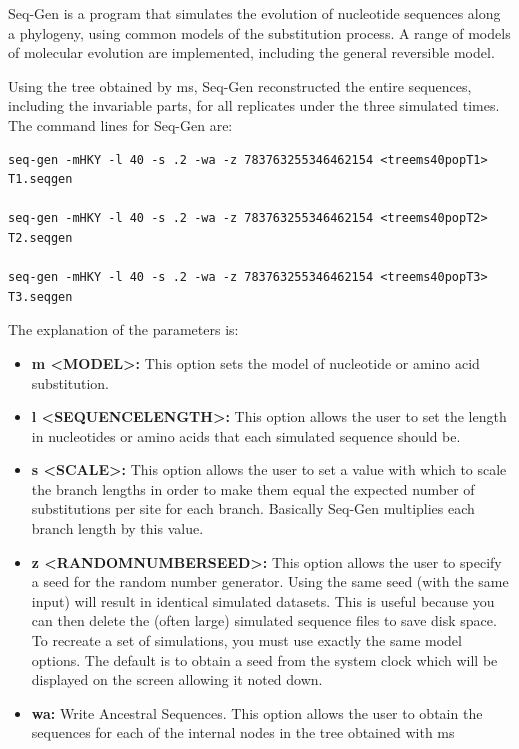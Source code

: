Seq-Gen \cite{rambaut1997seq} is a program that simulates the evolution of nucleotide sequences along a phylogeny, using common models of the substitution process. A range of models of molecular evolution are implemented, including the general reversible model. 

Using the tree obtained by ms, Seq-Gen reconstructed the entire sequences, including the invariable parts, for all replicates under the three simulated times. The command lines for Seq-Gen are: 

\begin{verbatim}
seq-gen -mHKY -l 40 -s .2 -wa -z 783763255346462154 <treems40popT1> T1.seqgen

seq-gen -mHKY -l 40 -s .2 -wa -z 783763255346462154 <treems40popT2> T2.seqgen

seq-gen -mHKY -l 40 -s .2 -wa -z 783763255346462154 <treems40popT3> T3.seqgen

\end{verbatim}

The explanation of the parameters is:

\begin{itemize}

\item\textbf{m <MODEL>:} This option sets the model of nucleotide or amino acid substitution.
\item\textbf{l <SEQUENCELENGTH>:} This option allows the user to set the length in nucleotides or amino acids that each simulated sequence should be.
\item\textbf{s <SCALE>:} This option allows the user to set a value with which to scale the branch lengths in order to make them equal the expected number of substitutions per site for each branch. Basically Seq-Gen multiplies each branch length by this value.
\item\textbf{z <RANDOMNUMBERSEED>:} This option allows the user to specify a seed for the random number generator. Using the same seed (with the same input) will result in identical simulated datasets. This is useful because you can then delete the (often large) simulated sequence files to save disk space. To recreate a set of simulations, you must use exactly the same model options. The default is to obtain a seed from the system clock which will be displayed on the screen allowing it noted down.
\item\textbf{wa:}
Write Ancestral Sequences. This option allows the user to obtain the sequences for each of the internal nodes in the tree obtained with ms 
\end{itemize}

